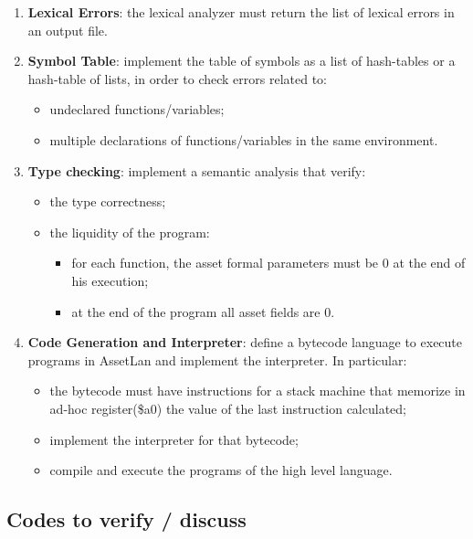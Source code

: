 \documentclass[11pt]{article} %
\begin{document}
\begin{enumerate}
\item \textbf{Lexical Errors}: the lexical analyzer must return the list of lexical errors in an output file. 
\item \textbf{Symbol Table}: implement the table of symbols as a list of hash-tables or a hash-table of lists, in order to check errors related to:
\begin{itemize}
\item undeclared functions/variables;
\item multiple declarations of functions/variables in the same environment.
\end{itemize}
\item \textbf{Type checking}: implement a semantic analysis that verify:
\begin{itemize}
\item the type correctness;
\item the liquidity of the program:
\begin{itemize}
\item for each function, the asset formal parameters must be $0$ at the end of his execution;
\item at the end of the program all asset fields are $0$.
\end{itemize} 
\end{itemize}
\item \textbf{Code Generation and Interpreter}: define a bytecode language to execute programs in AssetLan and implement the interpreter. In particular:
\begin{itemize}
\item the bytecode must have instructions for a stack machine that memorize in ad-hoc register(\$a0) the value of the last instruction calculated;
\item implement the interpreter for that bytecode;
\item compile and execute the programs of the high level language.
\end{itemize} 
\end{enumerate}

\subsection{Codes to verify / discuss}






\end{document}
